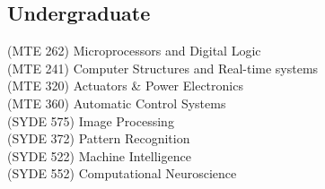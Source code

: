 \documentclass[]{deedy-resume-openfont}
\begin{document}
\begin{minipage}[t]{0.33\textwidth}
\subsection{Undergraduate}
(MTE 262) Microprocessors and Digital Logic\\
(MTE 241) Computer Structures and Real-time systems \\
(MTE 320) Actuators \& Power Electronics\\
(MTE 360) Automatic Control Systems\\
(SYDE 575) Image Processing\\
(SYDE 372) Pattern Recognition\\
(SYDE 522) Machine Intelligence\\
(SYDE 552) Computational Neuroscience\\
\sectionsep


%
%

\end{minipage}
\hfill
\end{document}
